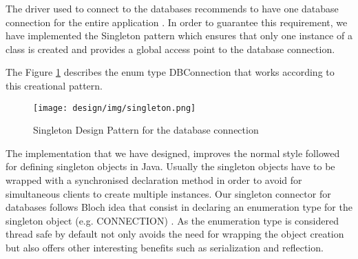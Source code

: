 	The driver used to connect to the databases recommends to have one database connection for the entire application \cite{web:mongodb16}. In order to guarantee this requirement, we have implemented the Singleton pattern which ensures that only one instance of a class is created and provides a global access point to the database connection.

	The Figure \ref{fig:design:singletonPattern} describes the enum type DBConnection that works according to this creational pattern.

	\begin{figure}[H]
	\centering
	\texttt{[image: design/img/singleton.png]}
	\caption{Singleton Design Pattern for the database connection}
	\label{fig:design:singletonPattern}
	\end{figure}

	The implementation that we have designed, improves the normal style followed for defining singleton objects in Java. Usually the singleton objects have to be wrapped with a synchronised declaration method in order to avoid for simultaneous clients to create multiple instances. Our singleton connector for databases follows Bloch idea that consist in declaring an enumeration type for the singleton object (e.g. CONNECTION) \cite{book:bloch08}. As the enumeration type is considered thread safe by default not only avoids the need for wrapping the object creation but also offers other interesting benefits such as serialization and reflection.

	